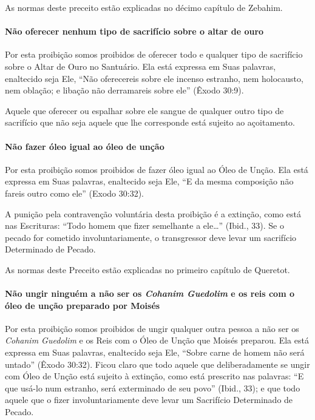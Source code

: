 As normas deste preceito estão explicadas no décimo capítulo de Zebahim.

\paragraph{Não oferecer nenhum tipo de sacrifício sobre o altar de ouro}

Por esta proibição somos proibidos de oferecer todo e qualquer tipo de
sacrifício sobre o Altar de Ouro no Santuário. Ela está expressa em Suas
palavras, enaltecido seja Ele, ``Não oferecereis sobre ele incenso
estranho, nem holocausto, nem oblação; e libação não derramareis sobre
ele'' (Êxodo 30:9).

Aquele que oferecer ou espalhar sobre ele sangue de qualquer outro tipo
de sacrifício que não seja aquele que lhe corresponde está sujeito ao
açoitamento.

\paragraph{Não fazer óleo igual ao óleo de unção}

Por esta proibição somos proibidos de fazer óleo igual ao Óleo de Unção.
Ela está expressa em Suas palavras, enaltecido seja Ele, ``E da mesma
composição não fareis outro como ele'' (Exodo 30:32).

A punição pela contravenção voluntária desta proibição é a extinção,
como está nas Escrituras: ``Todo homem que fizer semelhante a ele\ldots{}''
(Ibid., 33). Se o pecado for cometido involuntariamente, o transgressor
deve levar um sacrifício Determinado de Pecado.

As normas deste Preceito estão explicadas no primeiro capítulo de Queretot.

\paragraph{Não ungir ninguém a não ser os \textit{Cohanim Guedolim} e os reis com o óleo de
unção preparado por Moisés}

Por esta proibição somos proibidos de ungir qualquer outra pessoa a não
ser os \textit{Cohanim Guedolim} e os Reis com o Óleo de Unção que Moisés
preparou. Ela está expressa em Suas palavras, enaltecido seja Ele,
``Sobre carne de homem não será untado'' (Êxodo 30:32). Ficou claro que
todo aquele que deliberadamente se ungir com Óleo de Unção está sujeito
à extinção, como está prescrito nas palavras: ``E que usá-lo num
estranho, será exterminado de seu povo'' (Ibid., 33); e que todo aquele
que o fizer involuntariamente deve levar um Sacrifício Determinado de
Pecado.

